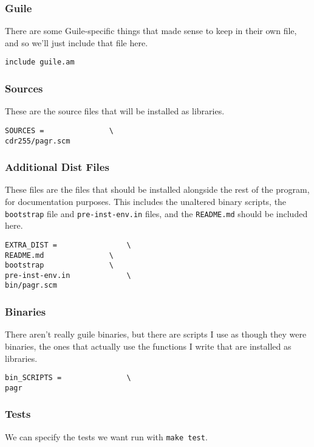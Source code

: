\documentclass[11pt]{article}
\begin{document}
\subsubsection{Guile}
\label{sec:org931a368}
There are some Guile-specific things that made sense to keep in their own file,
and so we'll just include that file here.
\begin{verbatim}
include guile.am

\end{verbatim}

\subsubsection{Sources}
\label{sec:org29cdb1e}
These are the source files that will be installed as libraries.

\begin{verbatim}
SOURCES =				\
cdr255/pagr.scm

\end{verbatim}

\subsubsection{Additional Dist Files}
\label{sec:orgc6fc010}
These files are the files that should be installed alongside the rest of the
program, for documentation purposes. This includes the unaltered binary scripts,
the \texttt{bootstrap} file and \texttt{pre-inst-env.in} files, and the \texttt{README.md} should be
included here.

\begin{verbatim}
EXTRA_DIST =				\
README.md				\
bootstrap				\
pre-inst-env.in				\
bin/pagr.scm

\end{verbatim}

\subsubsection{Binaries}
\label{sec:orgda98686}
There aren't really guile binaries, but there are scripts I use as though they
were binaries, the ones that actually use the functions I write that are
installed as libraries.

\begin{verbatim}
bin_SCRIPTS =				\
pagr

\end{verbatim}

\subsubsection{Tests}
\label{sec:org43d33dc}
We can specify the tests we want run with \texttt{make test}.
\end{document}
